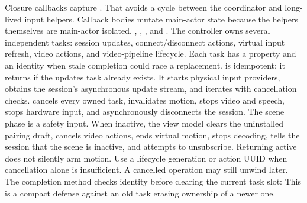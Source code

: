 {}Closure callbacks capture . That avoids a cycle between the coordinator and long-lived input helpers. Callback bodies mutate main-actor state because the helpers themselves are main-actor isolated.\markdownRendererInterblockSeparator
{}
\markdownRendererSectionEnd \markdownRendererSectionBegin
{}\markdownRendererInterblockSeparator
{}\markdownRendererBlockQuoteBegin
{} , , , and .\markdownRendererBlockQuoteEnd \markdownRendererInterblockSeparator
{}The controller owns several independent tasks: session updates, connect/disconnect actions, virtual input refresh, video actions, and video-pipeline lifecycle. Each task has a property and an identity when stale completion could race a replacement.\markdownRendererParagraphSeparator
{} is idempotent: it returns if the updates task already exists. It starts physical input providers, obtains the session's asynchronous update stream, and iterates with cancellation checks.  cancels every owned task, invalidates motion, stops video and speech, stops hardware input, and asynchronously disconnects the session.\markdownRendererParagraphSeparator
{}The scene phase is a safety input. When inactive, the view model clears the uninstalled pairing draft, cancels video actions, ends virtual motion, stops decoding, tells the session that the scene is inactive, and attempts to unsubscribe. Returning active does not silently arm motion.\markdownRendererParagraphSeparator
{}Use a lifecycle generation or action UUID when cancellation alone is insufficient. A cancelled operation may still unwind later. The completion method checks identity before clearing the current task slot:\markdownRendererInterblockSeparator
{}\markdownRendererInterblockSeparator
{}This is a compact defense against an old task erasing ownership of a newer one.\markdownRendererInterblockSeparator
{}
\markdownRendererSectionEnd \markdownRendererSectionBegin
{}\markdownRendererInterblockSeparator
{}\markdownRendererBlockQuoteBegin
